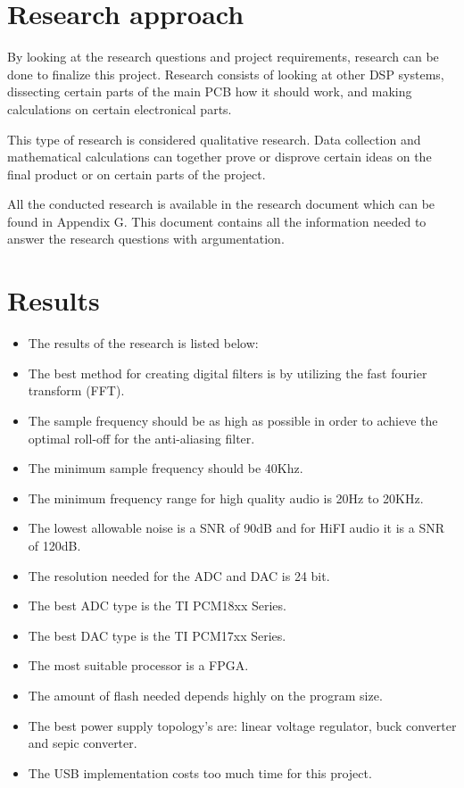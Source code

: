 \section{Research approach}

By looking at the research questions and project requirements, research can be done to finalize this project. Research consists of looking at other DSP systems, dissecting certain parts of the main PCB how it should work, and making calculations on certain electronical parts.  
\par
\noindent This type of research is considered qualitative research. Data collection and mathematical calculations can together prove or disprove certain ideas on the final product or on certain parts of the project.
\par
\noindent
All the conducted research is available in the research document which can be found in Appendix G. This document contains all the information needed to answer the research questions with argumentation. 

\section{Results}
\begin{itemize} %
	\setlength\itemsep{-0.3em} %
		\item The results of the research is listed below:
		\item The best method for creating digital filters is by utilizing the fast fourier transform (FFT).
		\item The sample frequency should be as high as possible in order to achieve the optimal roll-off for the anti-aliasing filter. 
		\item The minimum sample frequency should be 40Khz.
		\item The minimum frequency range for high quality audio is 20Hz to 20KHz.
		\item The lowest allowable noise is a SNR of 90dB and for HiFI audio it is a SNR of 120dB.
		\item The resolution needed for the ADC and DAC is 24 bit.
		\item The best ADC type is the TI PCM18xx Series.
		\item The best DAC type is the TI PCM17xx Series.
		\item The most suitable processor is a FPGA.
		\item The amount of flash needed depends highly on the program size.
		\item The best power supply topology's are: linear voltage regulator, buck converter and sepic converter.
		\item The USB implementation costs too much time for this project.
\end{itemize} 